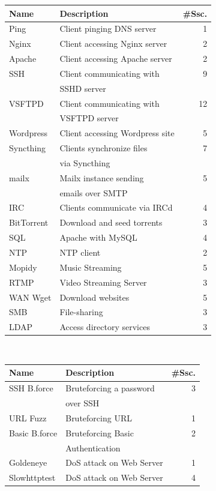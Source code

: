 \documentclass[runningheads]{llncs}
\begin{document}
\begin{table}
\scriptsize
\begin{tabular}[t]{l|l|r}
 \hline
 Name & Description & \#Ssc. \\
 \hline
 Ping & Client pinging DNS server & 1 \\
 Nginx & Client accessing Nginx server & 2\\
 Apache & Client accessing Apache server & 2\\
 SSH & Client communicating with & 9\\
 &SSHD server&\\
 VSFTPD & Client communicating with & 12\\
 &VSFTPD server&\\
 Wordpress & Client accessing Wordpress site & 5\\
 Syncthing& Clients synchronize files & 7\\
 &via Syncthing&\\
 mailx& Mailx instance sending & 5\\
 &emails over SMTP &\\
 IRC & Clients communicate via IRCd& 4\\
 BitTorrent & Download and seed torrents & 3 \\
 SQL & Apache with MySQL & 4\\
 NTP & NTP client & 2\\
 Mopidy & Music Streaming & 5\\
 RTMP & Video Streaming Server & 3\\
 WAN Wget & Download websites & 5 \\
 SMB & File-sharing & 3 \\
 LDAP & Access directory services & 3 \\
\hline
\end{tabular}
~
\begin{tabular}[t]{l|l|r}
 \hline
 Name & Description & \#Ssc. \\
 \hline
 SSH B.force & Bruteforcing a password & 3\\
 &over SSH&\\
 URL Fuzz & Bruteforcing URL & 1\\
 Basic B.force & Bruteforcing Basic & 2\\
 &Authentication&\\
 Goldeneye & DoS attack on Web Server & 1\\
 Slowhttptest & DoS attack on Web Server & 4 \\

\end{tabular}
\end{table}
\end{document}
